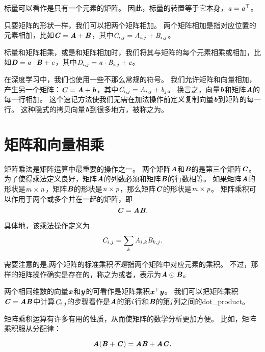 标量可以看作是只有一个元素的矩阵。
因此，标量的转置等于它本身，$\Sa=\Sa^\top$。


只要矩阵的形状一样，我们可以把两个矩阵相加。
两个矩阵相加是指对应位置的元素相加，比如$\MC=\MA+\MB$，其中$\SC_{i,j}= \SA_{i,j}+\SB_{i,j}$。


标量和矩阵相乘，或是和矩阵相加时，我们将其与矩阵的每个元素相乘或相加，比如$\MD = \Sa \cdot \MB + \Sc$，其中$\SD_{i,j} = \Sa\cdot  \SB_{i,j} + \Sc$。


在深度学习中，我们也使用一些不那么常规的符号。
我们允许矩阵和向量相加，产生另一个矩阵：$\MC=\MA + \Vb$，其中$\SC_{i,j}= \SA_{i,j} + \Sb_{j}$。
换言之，向量$\Vb$和矩阵$\MA$的每一行相加。
这个速记方法使我们无需在加法操作前定义复制向量$\Vb$到矩阵的每一行。
这种隐式的拷贝向量$\Vb$到很多地方，被称之为。




\section{矩阵和向量相乘}
\label{sec:multiplying_matrices_and_vectors}

矩阵乘法是矩阵运算中最重要的操作之一。
两个矩阵$\MA$和$\MB$的是第三个矩阵$\MC$。
为了使得乘法定义良好，矩阵$\MA$的列数必须和矩阵$\MB$的行数相等。
如果矩阵$\MA$的形状是$\Sm \times \Sn$，矩阵$\MB$的形状是$\Sn\times \Sp$，那么矩阵$\MC$的形状是$\Sm\times \Sp$。
矩阵乘积可以作用于两个或多个并在一起的矩阵，即
\begin{equation}
    \MC=\MA\MB.
\end{equation}


具体地，该乘法操作定义为
\begin{equation}
    \SC_{i,j}=\sum_k \SA_{i,k} \SB_{k,j}.
\end{equation}


需要注意的是,两个矩阵的标准乘积\emph{不是}指两个矩阵中对应元素的乘积。
不过，那样的矩阵操作确实是存在的，称之为或者，表示为$\MA\odot\MB$。


两个相同维数的向量$\Vx$和$\Vy$的可看作是矩阵乘积$\Vx^\top\Vy$。
我们可以把矩阵乘积$\MC=\MA\MB$中计算$\SC_{i,j}$的步骤看作是$\MA$的第$\Si$行和$\MB$的第$\Sj$列之间的\gls{dot_product}。


矩阵乘积运算有许多有用的性质，从而使矩阵的数学分析更加方便。
比如，矩阵乘积服从分配律：


\begin{equation}
    \MA(\MB+\MC)=\MA\MB +\MA\MC.
\end{equation}


